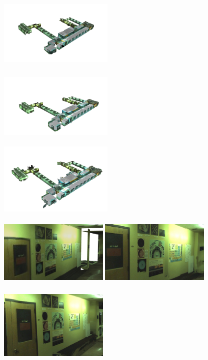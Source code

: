 \documentclass[]{spie}  %
\begin{document}
\begin{figure}
  \centering
  \includegraphics[width=2.2in,height=1.5in]{results_swarm_3_v.png}
  \includegraphics[width=2.2in,height=1.5in]{results_swarm_3_2d.png}
  \includegraphics[width=2.2in,height=1.5in]{results_swarm_3_3d.png}\\
  \includegraphics[width=2.1in,height=1.5in]{results_swarm_2_v.png}
  \includegraphics[width=2.1in,height=1.5in]{results_swarm_2_2d.png}
  \includegraphics[width=2.1in,height=1.5in]{results_swarm_2_3d.png}\\

\end{figure}
\end{document}
